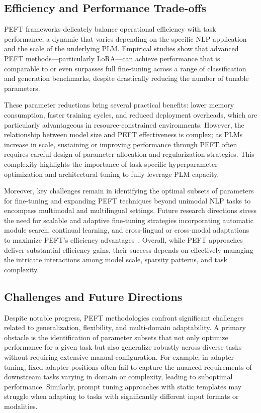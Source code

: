 \documentclass[sigconf]{acmart}
\begin{document}
\subsection{Efficiency and Performance Trade-offs}

PEFT frameworks delicately balance operational efficiency with task performance, a dynamic that varies depending on the specific NLP application and the scale of the underlying PLM. Empirical studies show that advanced PEFT methods—particularly LoRA—can achieve performance that is comparable to or even surpasses full fine-tuning across a range of classification and generation benchmarks, despite drastically reducing the number of tunable parameters.

These parameter reductions bring several practical benefits: lower memory consumption, faster training cycles, and reduced deployment overheads, which are particularly advantageous in resource-constrained environments. However, the relationship between model size and PEFT effectiveness is complex; as PLMs increase in scale, sustaining or improving performance through PEFT often requires careful design of parameter allocation and regularization strategies. This complexity highlights the importance of task-specific hyperparameter optimization and architectural tuning to fully leverage PLM capacity.

Moreover, key challenges remain in identifying the optimal subsets of parameters for fine-tuning and expanding PEFT techniques beyond unimodal NLP tasks to encompass multimodal and multilingual settings. Future research directions stress the need for scalable and adaptive fine-tuning strategies incorporating automatic module search, continual learning, and cross-lingual or cross-modal adaptations to maximize PEFT’s efficiency advantages~\cite{ref48}. Overall, while PEFT approaches deliver substantial efficiency gains, their success depends on effectively managing the intricate interactions among model scale, sparsity patterns, and task complexity.

\subsection{Challenges and Future Directions}

Despite notable progress, PEFT methodologies confront significant challenges related to generalization, flexibility, and multi-domain adaptability. A primary obstacle is the identification of parameter subsets that not only optimize performance for a given task but also generalize robustly across diverse tasks without requiring extensive manual configuration. For example, in adapter tuning, fixed adapter positions often fail to capture the nuanced requirements of downstream tasks varying in domain or complexity, leading to suboptimal performance. Similarly, prompt tuning approaches with static templates may struggle when adapting to tasks with significantly different input formats or modalities.
\end{document}

